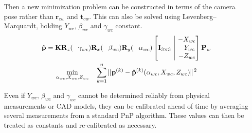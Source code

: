 \documentclass{article}
\makeatletter
\newcommand{\onebytwo}[2]{\ensuremath{\left[\begin{array}{@{}c|c@{}} #1 & #2 \end{array}\right]}}
\makeatother
\begin{document}
Then a new minimization problem can be constructed in terms of the camera pose rather than $\mathbf{r}_{cw}$ and $\mathbf{t}_{cw}$. This can also be solved using Levenberg–Marquardt, holding $Y_{wc}$, $\beta_{wc}$ and $\gamma_{wc}$ constant.
\begin{gather*}
    \hat{\mathbf{p}}=\mathbf{K} \mathbf{R}_z(-\gamma_{wc}) \mathbf{R}_x(-\beta_{wc}) \mathbf{R}_y(-\alpha_{wc}) \onebytwo{\mathbf{I}_{3 \times 3}}{\begin{matrix}-X_{wc} \\ -Y_{wc} \\ -Z_{wc}\end{matrix}}  \mathbf{P}_w \\
    \min_{\alpha_{wc}, X_{wc}, Z_{wc}} \quad \sum_{k=1}^{n}{||\mathbf{p}^{(k)}-\mathbf{\hat{p}}^{(k)}(\alpha_{wc}, X_{wc}, Z_{wc})||^2}
\end{gather*}

Even if $Y_{wc}$, $\beta_{wc}$ and $\gamma_{wc}$ cannot be determined reliably from physical measurements or CAD models, they can be calibrated ahead of time by averaging several measurements from a standard PnP algorithm. These values can then be treated as constants and re-calibrated as necessary.



\end{document}
